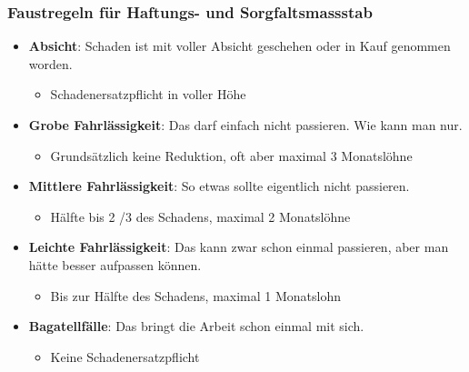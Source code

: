 \subsubsection{Faustregeln für Haftungs- und Sorgfaltsmassstab}
\begin{itemize}
    \item \textbf{Absicht}: Schaden ist mit voller Absicht geschehen oder in Kauf genommen worden.
    \begin{itemize}
        \item Schadenersatzpflicht in voller Höhe
    \end{itemize}
    \item \textbf{Grobe Fahrlässigkeit}: Das darf einfach nicht passieren. Wie kann man nur.
    \begin{itemize}
        \item Grundsätzlich keine Reduktion, oft aber maximal 3 Monatslöhne
    \end{itemize}
    \item \textbf{Mittlere Fahrlässigkeit}: So etwas sollte eigentlich nicht passieren.
    \begin{itemize}
        \item Hälfte bis 2 /3 des Schadens, maximal 2 Monatslöhne
    \end{itemize}
    \item \textbf{Leichte Fahrlässigkeit}: Das kann zwar schon einmal passieren, aber man hätte besser aufpassen können.
    \begin{itemize}
        \item Bis zur Hälfte des Schadens, maximal 1 Monatslohn
    \end{itemize}
    \item \textbf{Bagatellfälle}: Das bringt die Arbeit schon einmal mit sich.
    \begin{itemize}
        \item Keine Schadenersatzpflicht
    \end{itemize}
\end{itemize}

\newpage

